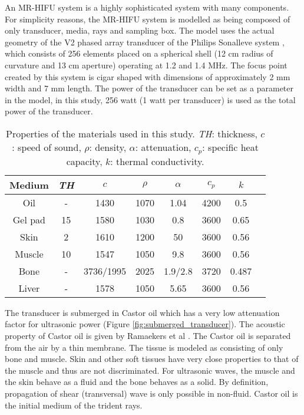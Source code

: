 An MR-HIFU system is a highly sophisticated system with many components. For simplicity reasons, the MR-HIFU system is modelled as being composed of only transducer, media, rays and sampling box. The model uses the actual geometry of the V2 phased array transducer of the Philips Sonalleve system \cite{sonalleve}, which consists of 256 elements placed on a spherical shell (12 cm radius of curvature and 13 cm aperture) operating at 1.2 and 1.4 MHz. The focus point created by this system is cigar shaped with dimensions of approximately 2 mm width and 7 mm length. The power of the transducer can be set as a parameter in the model, in this study, 256 watt (1 watt per transducer) is used as the total power of the transducer. 

\begin{table}[h!]
    \centering
    \begin{tabular}{c c c c c c c c} 
        \hline
        Medium & \textit{TH} & $c$ & $\rho$ & $\alpha$ & $c_p$ & $k$ \\ [0.5ex] 
        \hline\hline
        Oil & - & 1430 & 1070 & 1.04 & 4200 & 0.5 \\
        \hline
        Gel pad & 15 & 1580 & 1030 & 0.8 & 3600 & 0.65 \\
        \hline
        Skin & 2 & 1610 & 1200 & 50 & 3600 & 0.56 \\
        \hline
        Muscle & 10 & 1547 & 1050 & 9.8 & 3600 & 0.56 \\
        \hline
        Bone & - & 3736/1995 & 2025 & 1.9/2.8 & 3720 & 0.487 \\
        \hline
        Liver & - & 1578 & 1050 & 5.65 & 3600 & 0.56 \\
        \hline
    \end{tabular}
    \caption{Properties of the materials used in this study. \textit{TH}: thickness,  $c$: speed of sound, $\rho$: density,  $\alpha$: attenuation, $c_p$: specific heat capacity, $k$: thermal conductivity. \cite{Modena_2018} \cite{markoil}}
    \label{tb:media_property}
\end{table}

The transducer is submerged in Castor oil which has a very low attenuation factor for ultrasonic power (Figure \ref{fig:submerged_transducer}). The acoustic property of Castor oil is given by Ramaekers et al \cite{markoil}. The Castor oil is separated from the air by a thin membrane. The tissue is modeled as consisting of only bone and muscle. Skin and other soft tissues have very close properties to that of the muscle and thus are not discriminated. For ultrasonic waves, the muscle and the skin behave as a fluid and the bone behaves as a solid. By definition, propagation of shear (transversal) wave is only possible in non-fluid. Castor oil is the initial medium of the trident rays. 

